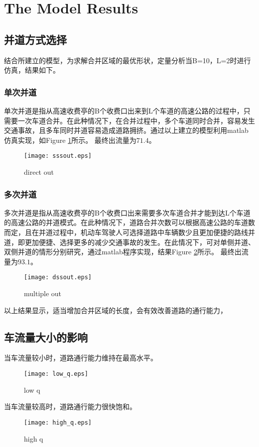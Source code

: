 \documentclass{mcmthesis}
\begin{document}
\section{The Model Results}
\subsection{并道方式选择}
结合所建立的模型，为求解合并区域的最优形状，定量分析当B=10，L=2时进行仿真，结果如下。
\subsubsection{单次并道}
单次并道是指从高速收费亭的B个收费口出来到L个车道的高速公路的过程中，只需要一次车道合并。在此种情况下，在合并过程中，多个车道同时合并，容易发生交通事故，且多车同时并道容易造成道路拥挤。通过以上建立的模型利用matlab仿真实现，如Figure \ref{fig:direct_out}所示。
最终出流量为$71.4$。
\begin{figure}[!htbp]
	\small
	\centering
	\texttt{[image: sssout.eps]}
	\caption{direct out} 
	\label{fig:direct_out}
\end{figure}
\subsubsection{多次并道}
多次并道是指从高速收费亭的B个收费口出来需要多次车道合并才能到达L个车道的高速公路的并道模式。在此种情况下，道路合并次数可以根据高速公路的车道数而定，且在并道过程中，机动车驾驶人可选择道路中车辆数少且更加便捷的路线并道，即更加便捷、选择更多的减少交通事故的发生。在此情况下，可对单侧并道、双侧并道的情形分别研究，通过matlab程序实现，结果Figure \ref{fig:multiple_out}所示。
最终出流量为$93.1$。
\begin{figure}[!htbp]
	\small
	\centering
	\texttt{[image: dssout.eps]}
	\caption{multiple out} 
	\label{fig:multiple_out}
\end{figure}

以上结果显示，适当增加合并区域的长度，会有效改善道路的通行能力，
\subsection{车流量大小的影响}
当车流量较小时，道路通行能力维持在最高水平。
\lipsum[9]
\begin{figure}[!htbp]
	\small
	\centering
	\texttt{[image: low\_q.eps]}
	\caption{low q} 
	\label{fig:q_low}
\end{figure}

当车流量较高时，道路通行能力很快饱和。
\begin{figure}[!htbp]
	\small
	\centering
	\texttt{[image: high\_q.eps]}
	\caption{high q} 
	\label{fig:q_high}
\end{figure}
\end{document}
